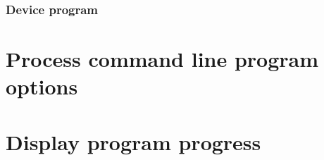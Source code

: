 
\subsubsection{Device program}
\label{app:sub:Device program}


\section{Process command line program options}
\label{app:sec:Process command line program options}


\section{Display program progress}
\label{app:sec:Display program progress}

